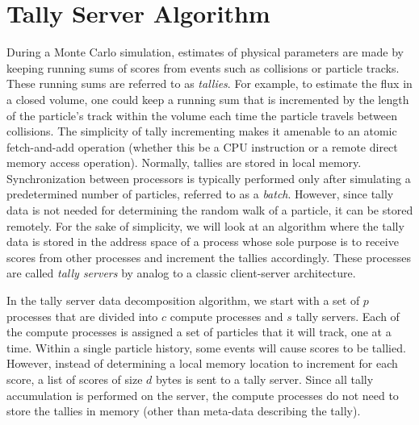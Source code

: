 \documentclass[3p,fleqn]{elsarticle}
\begin{document}
\section{Tally Server Algorithm}
\label{sec:algorithm}

During a Monte Carlo simulation, estimates of physical parameters are made by
keeping running sums of scores from events such as collisions or particle
tracks. These running sums are referred to as \emph{tallies}. For example, to
estimate the flux in a closed volume, one could keep a running sum that is
incremented by the length of the particle's track within the volume each time
the particle travels between collisions. The simplicity of tally incrementing
makes it amenable to an atomic fetch-and-add operation (whether this be a CPU
instruction or a remote direct memory access operation). Normally, tallies are
stored in local memory. Synchronization between processors is typically
performed only after simulating a predetermined number of particles, referred to
as a \emph{batch}. However, since tally data is not needed for determining the
random walk of a particle, it can be stored remotely. For the sake of
simplicity, we will look at an algorithm where the tally data is stored in the
address space of a process whose sole purpose is to receive scores from other
processes and increment the tallies accordingly. These processes are called
\emph{tally servers} by analog to a classic client-server architecture.

In the tally server data decomposition algorithm, we start with a set of $p$
processes that are divided into $c$ compute processes and $s$ tally
servers. Each of the compute processes is assigned a set of particles that it
will track, one at a time. Within a single particle history, some events will
cause scores to be tallied. However, instead of determining a local memory
location to increment for each score, a list of scores of size $d$ bytes is sent
to a tally server. Since all tally accumulation is performed on the server, the
compute processes do not need to store the tallies in memory (other than
meta-data describing the tally).
\end{document}
